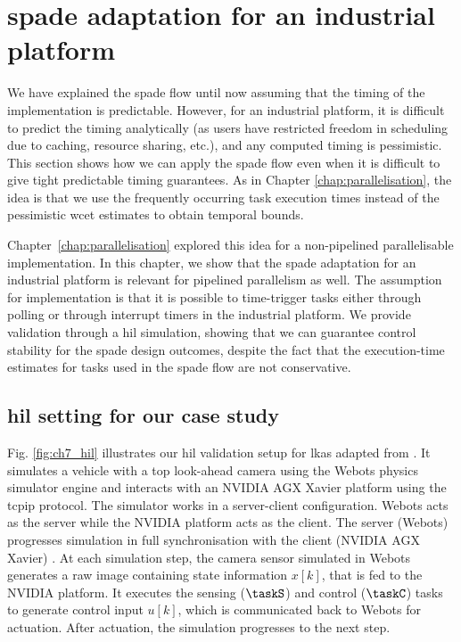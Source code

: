 \section{\texorpdfstring{\Gls{spade}}{SPADe} adaptation for an industrial platform}
\label{sec:ch7_SPADeIndustrial}
We have explained the \gls{spade} flow until now assuming that the timing of the implementation is predictable.
However, for an industrial platform, it is difficult to predict the timing analytically (as users have restricted freedom in scheduling due to caching, resource sharing, etc.), and any computed timing is pessimistic.
This section shows how we can apply the \gls{spade} flow even when it is difficult to give tight predictable timing guarantees.
As in Chapter \ref{chap:parallelisation}, the idea is that we use the frequently occurring task execution times instead of the pessimistic \gls{wcet} estimates to obtain temporal bounds. 

Chapter~\ref{chap:parallelisation} explored this idea for a non-pipelined parallelisable implementation. In this chapter, we show that the \gls{spade} adaptation for an industrial platform is relevant for pipelined parallelism as well.
The assumption for implementation is that it is possible to time-trigger tasks either through polling or through interrupt timers in the industrial platform.
We provide validation through a \gls{hil} simulation, showing that we can guarantee control stability for the \gls{spade} design outcomes, despite the fact that the execution-time estimates for tasks used in the \gls{spade} flow are not conservative.

\subsection{\texorpdfstring{\Gls{hil}}{HiL} setting for our case study}
\label{sec:ch7_HiLSetting}
Fig. \ref{fig:ch7_hil} illustrates our \gls{hil} validation setup for \gls{lkas} adapted from \cite{mohamed2019imacs}. It simulates a vehicle with a top look-ahead camera using the Webots \cite{michel2004cyberbotics} physics simulator engine and interacts with an NVIDIA AGX Xavier platform using the \gls{tcpip} protocol. The simulator works in a server-client configuration. Webots acts as the server while the NVIDIA platform acts as the client. The server (Webots) progresses simulation in full synchronisation with the client (NVIDIA AGX Xavier) \cite{nvidiaAGX}. At each simulation step, the camera sensor simulated in Webots generates a raw image containing state information $x[k]$, that is fed to the NVIDIA platform. It executes the sensing ($\taskS$) and control ($\taskC$) tasks to generate control input $u[k]$, which is communicated back to Webots for actuation. After actuation, the simulation progresses to the next step. 

